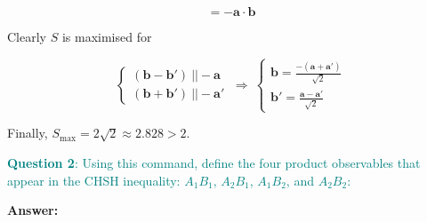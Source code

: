 \documentclass[11pt,dvipsnames]{article}
\begin{document}
$$
= -\mathbf{a}\cdot\mathbf{b}
$$

Clearly $S$ is maximised for

$$
\begin{cases}
(\mathbf{b}-\mathbf{b'})\ ||-\mathbf{a} \\[1em]
(\mathbf{b}+\mathbf{b'})\ ||-\mathbf{a'}
\end{cases}
\ \Rightarrow\ 
\begin{cases}
\mathbf{b}  = \frac{-(\mathbf{a}+\mathbf{a'})}{\sqrt{2}} \\[1em]
\mathbf{b'} = \frac{\mathbf{a}-\mathbf{a'}}{\sqrt{2}} 
\end{cases}
$$

Finally, $S_{\max}=2\sqrt{2}\approx2.828>2$.

\textcolor{teal}{\textbf{Question 2}: Using this command,
define the four product observables that appear in the CHSH inequality:
\(A_1B_1\), \(A_2B_1\), \(A_1B_2\), and \(A_2B_2\):}


\textbf{Answer:}
\end{document}
